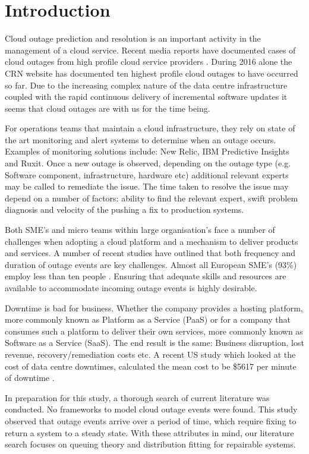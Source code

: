 \documentclass[5p]{elsarticle}
\begin{document}
\linenumbers

\section{Introduction}
Cloud outage prediction and resolution is an important activity in the management of a cloud service. Recent media reports have documented cases of cloud outages from high profile cloud service providers \cite{CRN2016outage}. During 2016 alone the CRN website has documented ten highest profile cloud outages to have occurred so far.  Due to the increasing complex nature of the data centre infrastructure coupled with the rapid continuous delivery of incremental software updates it seems that cloud outages are with us for the time being.

For operations teams that maintain a cloud infrastructure, they rely on state of the art monitoring and alert systems to determine when an outage occurs. Examples of monitoring solutions include: New Relic, IBM Predictive Insights and Ruxit. Once a new outage is observed, depending on the outage type (e.g. Software component, infrastructure, hardware etc) additional relevant experts may be called to remediate the issue. The time taken to resolve the issue may depend on a number of factors: ability to find the relevant expert, swift problem diagnosis and velocity of the pushing a fix to production systems. 

Both SME's and micro teams within large organisation's face a number of challenges when adopting a cloud platform and a mechanism to deliver products and services. A number of recent studies have outlined that both frequency and duration of outage events are key challenges. Almost all European SME's (93\%) employ less than ten people \cite{europa2015sme}. Ensuring that adequate skills and resources are available to accommodate incoming outage events is highly desirable.

Downtime is bad for business. Whether the company provides a hosting platform, more commonly known as Platform as a Service (PaaS) or for a company that consumes such a platform to deliver their own services, more commonly known as Software as a Service (SaaS). The end result is the same: Business disruption, lost revenue, recovery/remediation costs etc. A recent US study which looked at the cost of data centre downtimes, calculated the mean cost to be \$5617 per minute of downtime \cite{DCcost}.

In preparation for this study, a thorough search of current literature was conducted. No frameworks to model cloud outage events were found. This study observed that outage events arrive over a period of time, which require fixing to return a system to a steady state. With these attributes in mind, our literature search focuses on  
queuing theory and distribution fitting for repairable systems.
\end{document}
